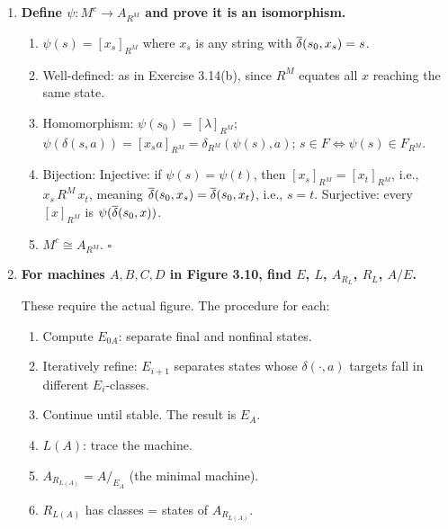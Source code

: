 \begin{enumerate}[{3.}1.]
($\Rightarrow$) Suppose $\mu(s)\,E_B\,\mu(t)$, i.e., $L(B^{\mu(s)})=L(B^{\mu(t)})$. By Exercise 3.10: $L(A^s)=L(B^{\mu(s)})$ and $L(A^t)=L(B^{\mu(t)})$ (since $\mu$ is a homomorphism from $A^s$ to $B^{\mu(s)}$). So $L(A^s)=L(A^t)$, i.e., $s\,E_A\,t$.

($\Leftarrow$) Suppose $s\,E_A\,t$. Then $L(A^s)=L(A^t)$. By the homomorphism property: $L(B^{\mu(s)})=L(A^s)=L(A^t)=L(B^{\mu(t)})$, so $\mu(s)\,E_B\,\mu(t)$. $\square$

\item \textbf{Define $\psi: M^c\to A_{R^M}$ and prove it is an isomorphism.}

\begin{enumerate}
\item $\psi(s)=[x_s]_{R^M}$ where $x_s$ is any string with $\overline{\delta}(s_0,x_s)=s$.

\item Well-defined: as in Exercise 3.14(b), since $R^M$ equates all $x$ reaching the same state.

\item Homomorphism: $\psi(s_0)=[\lambda]_{R^M}$; $\psi(\delta(s,a))=[x_sa]_{R^M}=\delta_{R^M}(\psi(s),a)$; $s\in F\Leftrightarrow\psi(s)\in F_{R^M}$.

\item Bijection: Injective: if $\psi(s)=\psi(t)$, then $[x_s]_{R^M}=[x_t]_{R^M}$, i.e., $x_s\,R^M\,x_t$, meaning $\overline{\delta}(s_0,x_s)=\overline{\delta}(s_0,x_t)$, i.e., $s=t$. Surjective: every $[x]_{R^M}$ is $\psi(\overline{\delta}(s_0,x))$.

\item $M^c\cong A_{R^M}$. $\square$
\end{enumerate}

\item \textbf{For machines $A,B,C,D$ in Figure 3.10, find $E$, $L$, $A_{R_L}$, $R_L$, $A/E$.}

These require the actual figure. The procedure for each:
\begin{enumerate}
\item Compute $E_{0A}$: separate final and nonfinal states.
\item Iteratively refine: $E_{i+1}$ separates states whose $\delta(\cdot,a)$ targets fall in different $E_i$-classes.
\item Continue until stable. The result is $E_A$.
\item $L(A)$: trace the machine.
\item $A_{R_{L(A)}}=A/_{E_A}$ (the minimal machine).
\item $R_{L(A)}$ has classes = states of $A_{R_{L(A)}}$.
\end{enumerate}


\end{enumerate}

